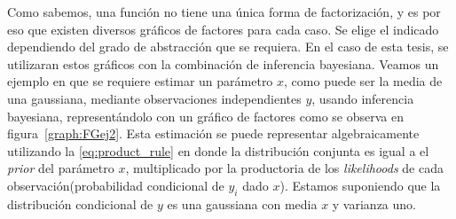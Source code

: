 \documentclass[11pt,twoside,spanish]{report} %
\begin{document}
Como sabemos, una funci\'on no tiene una \'unica forma de factorizaci\'on, y es por eso que existen diversos gr\'aficos de factores para cada caso.
Se elige el indicado dependiendo del grado de abstracci\'on que se requiera.
En el caso de esta tesis, se utilizaran estos gr\'aficos con la combinaci\'on de inferencia bayesiana.
Veamos un ejemplo en que se requiere estimar un par\'ametro $x$, como puede ser la media de una gaussiana, mediante observaciones independientes $y$, usando inferencia bayesiana, represent\'andolo con un gr\'afico de factores como se observa en figura~\ref{graph:FGej2}. 
Esta estimaci\'on se puede representar algebraicamente utilizando la \ref{eq:product_rule} en donde la distribuci\'on conjunta es igual a el \textit{prior} del par\'ametro $x$, multiplicado por la productoria de los \emph{likelihoods} de cada observaci\'on(probabilidad condicional de $y_i$ dado $x$).
Estamos suponiendo que la distribuci\'on condicional de $y$ es una gaussiana con media $x$ y varianza uno.
\end{document}

